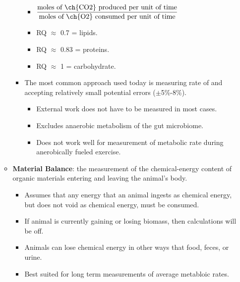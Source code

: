 \documentclass[12pt,a4paper]{article}
\begin{document}
\begin{itemize}
\begin{itemize}
\begin{itemize}
                    \begin{itemize}
                        \item $\dfrac{\text{moles of \ch{CO2} produced per unit of time}}{\text{moles of \ch{O2} consumed per unit of time}}$
                        \item RQ \(\approx\) 0.7 = lipids.
                        \item RQ \(\approx\) 0.83 = proteins. 
                        \item RQ \(\approx\) 1 = carbohydrate.
                     \end{itemize}
                \item The most common approach used today is measuring rate of  and accepting relatively small potential errors (\(\pm\)5\%-8\%).
                     \begin{itemize}
                         \item External work does not have to be measured in most cases.
                         \item Excludes anaerobic metabolism of the gut microbiome.
                         \item Does not work well for measurement of metabolic rate during anerobically fueled exercise.
                     \end{itemize}
            \end{itemize}
        \item \textbf{Material Balance}: the measurement of the chemical-energy content of organic materials entering and leaving the animal's body.
            \begin{itemize}
                \item Assumes that any energy that an animal ingests as chemical energy, but does not void as chemical energy,  must be consumed.
                \item If animal is currently gaining or losing biomass, then calculations will be off.
                \item Animals can lose chemical energy in other ways that food, feces, or urine.
                \item Best suited for {\color{o-Sun}long term} measurements of average metabloic rates.
            \end{itemize}
    \end{itemize}

\end{itemize}
\end{document}
